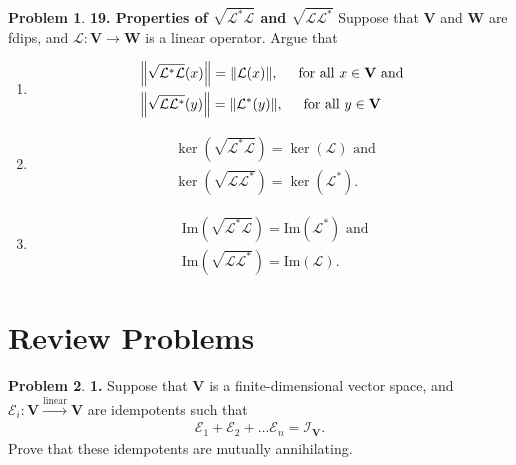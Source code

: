 \documentclass{book}
\theoremstyle{definition}
\newtheorem*{prob*}{Problem}
\newcommand{\V}{\mathbf{V}}
\newcommand{\W}{\mathbf{W}}
\newcommand{\lag}{\mathcal{L}}
\newcommand{\E}{\mathcal{E}}
\newcommand{\ima}{\text{Im}}
\newcommand{\lin}{\overset{\text{linear}}{\longrightarrow}}
\begin{document}
\begin{prob*}\textbf{19. Properties of $\sqrt{\lag^*\lag}$ and $\sqrt{\lag\lag^*}$}
	Suppose that $\V$ and $\W$ are fdips, and $\lag : \V \to \W $ is a linear operator. Argue that 
	\begin{enumerate}
		\item \begin{align*}
		&\norm{\sqrt{\lag^*\lag}(x)} = \norm{\lag(x)}, \hspace{0.5cm}  \text{for all $x\in \V$ and}\\
		&\norm{\sqrt{\lag\lag^*}(y)} = \norm{\lag^*(y)}, \hspace{0.5cm}  \text{for all $y\in \V$}
		\end{align*}
		
		
		\item 
		\begin{align*}
		&\ker(\sqrt{\lag^*\lag}) = \ker(\lag) \text{ and }\\
		&\ker(\sqrt{\lag\lag^*}) = \ker(\lag^*).
		\end{align*}
		
		
		\item 
		\begin{align*}
		&\ima(\sqrt{\lag^*\lag}) = \ima(\lag^*) \text{ and }\\
		&\ima(\sqrt{\lag\lag^*}) = \ima(\lag).
		\end{align*}
	\end{enumerate}
	
\end{prob*}




\newpage




\section{Review Problems}




\begin{prob*}\textbf{1.} Suppose that $\V$ is a finite-dimensional vector space, and $\E_i : \V \lin \V$ are idempotents such that 
	\begin{align*}
	\E_1 + \E_2 + \dots \E_n = \mathcal{I}_\V.
	\end{align*}
	Prove that these idempotents are mutually annihilating.
	
\end{prob*}


\newpage
\end{document}
